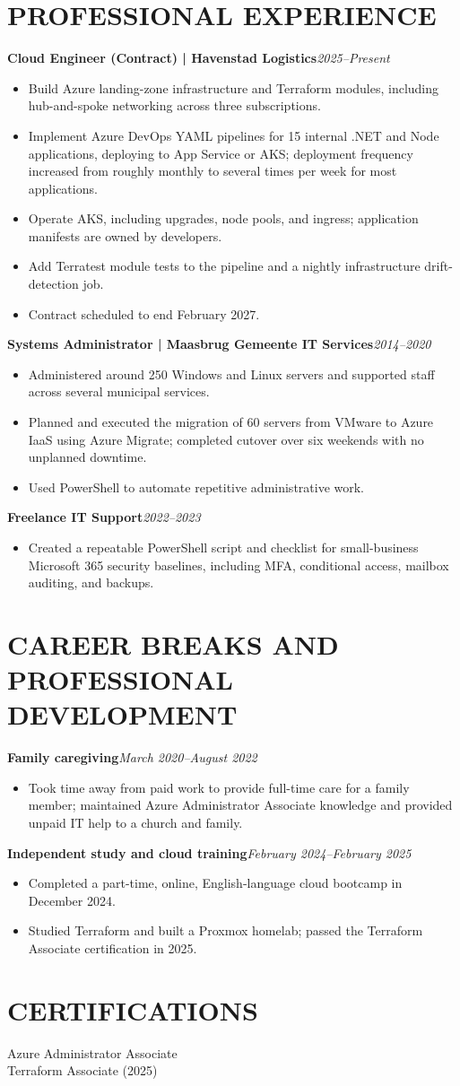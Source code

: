\documentclass[11pt,a4paper]{article}
\begin{document}
\section*{PROFESSIONAL EXPERIENCE}
\noindent\textbf{Cloud Engineer (Contract) | Havenstad Logistics}\hfill\textit{2025--Present}
\begin{itemize}
\item Build Azure landing-zone infrastructure and Terraform modules, including hub-and-spoke networking across three subscriptions.
\item Implement Azure DevOps YAML pipelines for 15 internal .NET and Node applications, deploying to App Service or AKS; deployment frequency increased from roughly monthly to several times per week for most applications.
\item Operate AKS, including upgrades, node pools, and ingress; application manifests are owned by developers.
\item Add Terratest module tests to the pipeline and a nightly infrastructure drift-detection job.
\item Contract scheduled to end February 2027.
\end{itemize}
\noindent\textbf{Systems Administrator | Maasbrug Gemeente IT Services}\hfill\textit{2014--2020}
\begin{itemize}
\item Administered around 250 Windows and Linux servers and supported staff across several municipal services.
\item Planned and executed the migration of 60 servers from VMware to Azure IaaS using Azure Migrate; completed cutover over six weekends with no unplanned downtime.
\item Used PowerShell to automate repetitive administrative work.
\end{itemize}
\noindent\textbf{Freelance IT Support}\hfill\textit{2022--2023}
\begin{itemize}
\item Created a repeatable PowerShell script and checklist for small-business Microsoft 365 security baselines, including MFA, conditional access, mailbox auditing, and backups.
\end{itemize}
\section*{CAREER BREAKS AND PROFESSIONAL DEVELOPMENT}
\noindent\textbf{Family caregiving}\hfill\textit{March 2020--August 2022}
\begin{itemize}
\item Took time away from paid work to provide full-time care for a family member; maintained Azure Administrator Associate knowledge and provided unpaid IT help to a church and family.
\end{itemize}
\noindent\textbf{Independent study and cloud training}\hfill\textit{February 2024--February 2025}
\begin{itemize}
\item Completed a part-time, online, English-language cloud bootcamp in December 2024.
\item Studied Terraform and built a Proxmox homelab; passed the Terraform Associate certification in 2025.
\end{itemize}
\section*{CERTIFICATIONS}
Azure Administrator Associate\\
Terraform Associate (2025)
\end{document}
